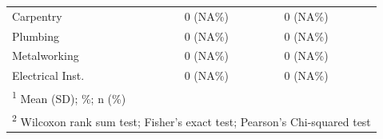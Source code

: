 \documentclass[
  11pt,
a4paper
]{article}
\begin{document}
\begin{table}[H]
\begin{tabular}[t]{lccc}
\hspace{1em}Carpentry & 0 (NA\%) & 0 (NA\%) & \\
\hspace{1em}Plumbing & 0 (NA\%) & 0 (NA\%) & \\
\hspace{1em}Metalworking & 0 (NA\%) & 0 (NA\%) & \\
\hspace{1em}Electrical Inst. & 0 (NA\%) & 0 (NA\%) & \\
\bottomrule
\multicolumn{4}{l}{\rule{0pt}{1em}\textsuperscript{1} Mean (SD); \%; n (\%)}\\
\multicolumn{4}{l}{\rule{0pt}{1em}\textsuperscript{2} Wilcoxon rank sum test; Fisher's exact test; Pearson's Chi-squared test}\\
\end{tabular}
\end{table}
\end{document}
